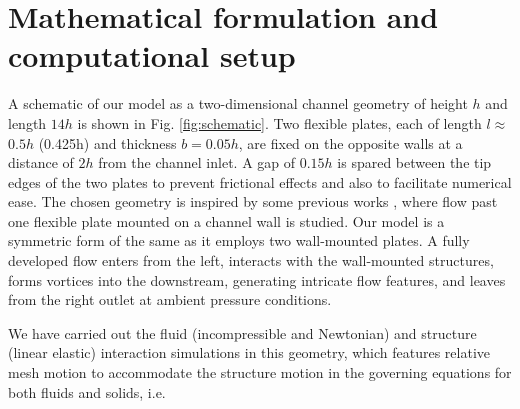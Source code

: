 \documentclass[%
aip,
amsmath,amssymb,
reprint,
]{revtex4-1}
\begin{document}
	
	\section{Mathematical formulation and computational setup}\label{sec:maths}
	A schematic of our model as a two-dimensional channel geometry of height $h$ and length $14h$ is shown in Fig. \ref{fig:schematic}. Two flexible plates, each of length $l $$\approx$$ 0.5h$ (0.425h) and thickness $b=0.05h$, are fixed on the opposite walls at a distance of $2h$ from the channel inlet. A gap of $0.15h$ is spared between the tip edges of the two plates to prevent frictional effects \cite{ Zenit2015} and also to facilitate numerical ease. The chosen geometry is inspired by some previous works \cite{ Zenit2014, Zenit2015, Zenit2016}, where flow past one flexible plate mounted on a channel wall is studied. Our model is a symmetric form of the same as it employs two wall-mounted plates. A fully developed flow enters from the left, interacts with the wall-mounted structures, forms vortices into the downstream, generating intricate flow features, and leaves from the right outlet at ambient pressure conditions. 
	
	We have carried out the fluid (incompressible and Newtonian) and structure (linear elastic) interaction simulations in this geometry, which features relative mesh motion to accommodate the structure motion in the governing equations for both fluids and solids, i.e.
	
\end{document}
